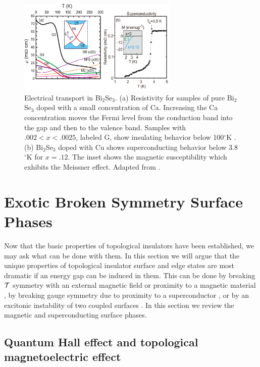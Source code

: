 \documentclass[twocolumn,floatfix,showpacs,rmp,aps]{revtex4}
\begin{document}
	\begin{figure}
		\includegraphics[width=3in]{Fig17}%
		\caption{Electrical transport in Bi$_2$Se$_3$.  (a) Resistivity for samples of
			pure Bi$_2$Se$_3$ doped with a small concentration of Ca.  Increasing the Ca
			concentration moves the Fermi level from the conduction band into the gap and
			then to the valence band.  Samples with $.002<x<.0025$, labeled G,
			show insulating behavior below 100$^\circ$K \cite{checkelsky09}.  (b) Bi$_2$Se$_3$ doped with Cu shows superconducting behavior
			below 3.8$^\circ$K for $x = .12$.  The inset shows the magnetic susceptibility
			which exhibits the Meissner effect.  Adapted from .
		}
		\label{fig:transport}
	\end{figure}
	
	\section{Exotic Broken Symmetry Surface Phases}
	\label{sec:exoticsurface}
	
	Now that the basic properties of topological insulators have been established,
	we may ask what can be done with them.  In this section we will argue
	that the unique properties of topological insulator surface and edge
	states are most dramatic if an energy gap can be induced in them.
	This can be done by breaking ${\cal T}$ symmetry with an external
	magnetic field \cite{fukane07} or proximity to a magnetic material \cite{qihugheszhang08}, by breaking gauge
	symmetry due to proximity to a superconductor \cite{fukane08}, or by an excitonic
	instability of two coupled surfaces \cite{seradjeh09}.  In this section we review
	the magnetic and superconducting surface phases.
	
	\subsection{Quantum Hall effect and topological magnetoelectric effect}
	\label{sec:qhetopomag}
	
\end{document}
